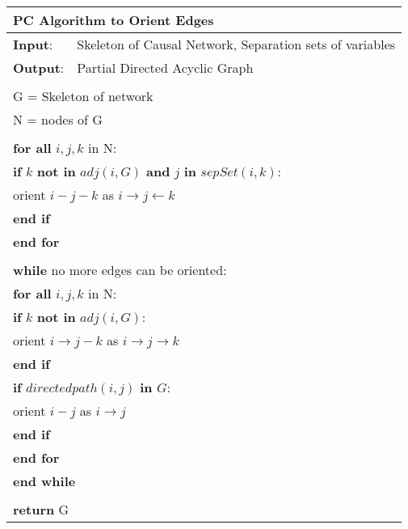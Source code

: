 \documentclass{article}
\begin{document}
\begin{table}[h!]
	\begin{tabular}{|l l|}
		\hline
		\multicolumn{2}{|l|}{PC Algorithm to Orient Edges}\\ 
		\hline
		\textbf{Input}: & Skeleton of Causal Network, Separation sets of variables\\
		\textbf{Output}: & Partial Directed Acyclic Graph\\
		&\\
		\multicolumn{2}{|l|}{G = Skeleton of network}\\
		\multicolumn{2}{|l|}{N = nodes of G}\\
		&\\
		\multicolumn{2}{|l|}{\textbf{for all} $ i,j,k $ in N:}\\
		\multicolumn{2}{|l|}{\quad\textbf{if} $ k $ \textbf{not in} $ adj(i,G) $ \textbf{and} $ j $ \textbf{in} $sepSet( i,k)$:}\\
		\multicolumn{2}{|l|}{\quad\quad orient $ i-j-k $ as $ i\rightarrow j \leftarrow k $ }\\
		\multicolumn{2}{|l|}{\quad\textbf{end if}}\\
		\multicolumn{2}{|l|}{\textbf{end for}}\\
		&\\
		\multicolumn{2}{|l|}{\textbf{while} no more edges can be oriented:}\\
		\multicolumn{2}{|l|}{\quad\textbf{for all} $ i,j,k $ in N:}\\
		\multicolumn{2}{|l|}{\quad\quad\textbf{if} $ k $ \textbf{not in} $ adj(i,G) $:}\\
		\multicolumn{2}{|l|}{\quad\quad\quad orient $ i\rightarrow j-k $ as $ i\rightarrow j \rightarrow k $ }\\
		\multicolumn{2}{|l|}{\quad\quad\textbf{end if}}\\
		\multicolumn{2}{|l|}{\quad\quad\textbf{if} $ directedpath(i,j)$ \textbf{in} $G $:}\\
		\multicolumn{2}{|l|}{\quad\quad\quad orient $ i- j $ as $ i\rightarrow j $ }\\
		\multicolumn{2}{|l|}{\quad\quad\textbf{end if}}\\

		\multicolumn{2}{|l|}{\quad\textbf{end for}}\\
		\multicolumn{2}{|l|}{\textbf{end while}}\\
		&\\
		\multicolumn{2}{|l|}{\textbf{return} G}\\
		\hline 
	\end{tabular}
\end{table}
\end{document}
